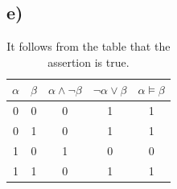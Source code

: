 \documentclass[11pt]{article}
\begin{document}
\subsection*{e)}
\begin{table}[h]
  \begin{tabular}{c|c||c|c|c}
    $\alpha$ & $\beta$ & $\alpha \wedge \neg \beta$ & $\neg \alpha \vee \beta$ & $\alpha \models \beta$\\
    \hline
    0 & 0 & 0 & 1 & 1\\
    0 & 1 & 0 & 1 & 1\\
    1 & 0 & 1 & 0 & 0\\
    1 & 1 & 0 & 1 & 1\\
  \end{tabular}
  \caption*{It follows from the table that the assertion is true.}
\end{table}
\end{document}
